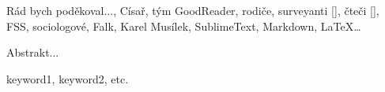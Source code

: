 \documentclass[12pt,oneside,final]{fithesis2}
\begin{document}
\FrontMatter
\ThesisTitlePage

\begin{ThesisDeclaration}
\DeclarationText
\AdvisorName
\end{ThesisDeclaration}

\begin{ThesisThanks}
Rád bych poděkoval..., Císař, tým GoodReader, rodiče, surveyanti [], čteči [], FSS, sociologové, Falk, Karel Musílek, SublimeText, Markdown, LaTeX…
\end{ThesisThanks}

\begin{ThesisAbstract}
Abstrakt...
\end{ThesisAbstract}

\begin{ThesisKeyWords}
keyword1, keyword2, etc.
\end{ThesisKeyWords}

\MainMatter

\tableofcontents          %





\end{document}
